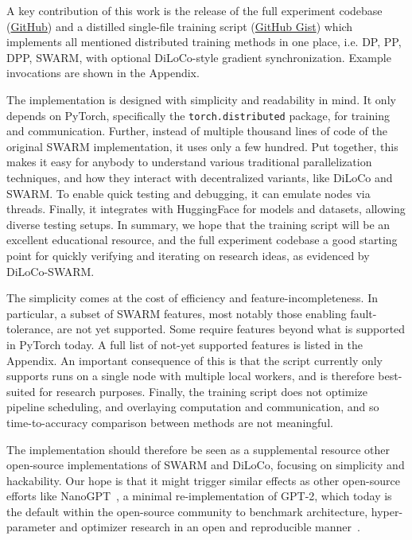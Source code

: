 \documentclass{article}
\newcommand{\github}{\href{https://github.com/mikasenghaas/diloco-swarm}{GitHub}}
\newcommand{\gist}{\href{https://gist.github.com/mikasenghaas/5fa1aa77ea69f187f531a5889983c249}{GitHub Gist}}
\begin{document}
A key contribution of this work is the release of the full experiment codebase
(\github{}) and a distilled single-file training script (\gist{}) which
implements all mentioned distributed training methods in one place, i.e. DP, PP,
DPP, SWARM, with optional DiLoCo-style gradient synchronization. Example
invocations are shown in the Appendix.

The implementation is designed with simplicity and readability in mind. It only
depends on PyTorch, specifically the \texttt{torch.distributed} package, for
training and communication. Further, instead of multiple thousand lines of code 
of the original SWARM implementation, it uses only a few hundred. Put together,
this makes it easy for anybody to understand various traditional parallelization
techniques, and how they interact with decentralized variants, like DiLoCo and
SWARM. To enable quick testing and debugging, it can emulate nodes via threads.
Finally, it integrates with HuggingFace for models and datasets, allowing
diverse testing setups. In summary, we hope that the training script will be an
excellent educational resource, and the full experiment codebase a good starting
point for quickly verifying and iterating on research ideas, as evidenced by
DiLoCo-SWARM.

The simplicity comes at the cost of efficiency and feature-incompleteness. In
particular, a subset of SWARM features, most notably those enabling
fault-tolerance, are not yet supported. Some require features beyond what is
supported in PyTorch today. A full list of not-yet supported features is listed
in the Appendix. An important consequence of this is that the script currently
only supports runs on a single node with multiple local workers, and is
therefore best-suited for research purposes. Finally, the training script does
not optimize pipeline scheduling, and overlaying computation and communication,
and so time-to-accuracy comparison between methods are not meaningful.

The implementation should therefore be seen as a supplemental resource other
open-source implementations of SWARM and DiLoCo, focusing on simplicity and
hackability. Our hope is that it might trigger similar effects as other
open-source efforts like NanoGPT~\cite{karpathy2024nanogpt}, a minimal
re-implementation of GPT-2, which today is the default within the open-source
community to benchmark architecture, hyper-parameter and optimizer research in
an open and reproducible manner~\cite{moddednanogpt2024}.
\end{document}
